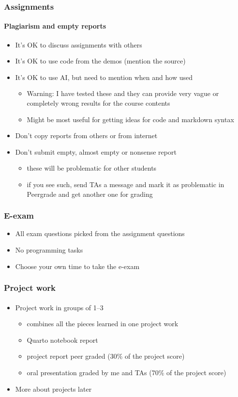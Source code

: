 \documentclass[english,t]{beamer}
\begin{document}
\begin{frame}
  \frametitle{Assignments}  %
  \framesubtitle{Plagiarism and empty reports}
  \begin{itemize}
  \item It's OK to discuss assignments with others
  \item It's OK to use code from the demos (mention the source)
  \item It's OK to use AI, but need to mention when and how used
    \begin{itemize}
    \item Warning: I have tested these and they can provide very vague
      or completely wrong results for the course contents
    \item Might be most useful for getting ideas for code and markdown syntax
    \end{itemize}
  \item Don't copy reports from others or from internet
  \item Don't submit empty, almost empty or nonsense report
    \begin{itemize}
    \item these will be problematic for other students
    \item if you see such, send TAs a message and mark it as
      problematic in Peergrade and get another one for grading
    \end{itemize}
  \end{itemize}
  
\end{frame}

\begin{frame}
  \frametitle{E-exam}  %
  \begin{itemize}
  \item All exam questions picked from the assignment questions
  \item No programming tasks
  \item Choose your own time to take the e-exam %
  \end{itemize}
  
\end{frame}


\begin{frame}
  \frametitle{Project work}  %
  \framesubtitle{}
  \begin{itemize}
  \item Project work in groups of 1--3
    \begin{itemize}
    \item combines all the pieces learned in one project work
    \item Quarto notebook report
    \item project report peer graded (30\% of the project score)
    \item oral presentation graded by me and TAs (70\% of the project score)
    \end{itemize}
  \item More about projects later
  \end{itemize}
  
\end{frame}
\end{document}
